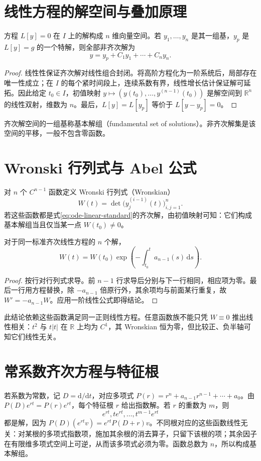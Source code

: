 \documentclass[UTF8,12pt,a4paper,fontset=fandol]{ctexbook}
\begin{document}
\section{线性方程的解空间与叠加原理}
\begin{theorem}
方程 $L[y]=0$ 在 $I$ 上的解构成 $n$ 维向量空间。若 $y_1,\ldots,y_n$ 是其一组基，$y_p$ 是 $L[y]=g$ 的一个特解，则全部非齐次解为
\[
 y=y_p+C_1y_1+\cdots+C_ny_n.
\]
\end{theorem}
\begin{proof}
线性性保证齐次解对线性组合封闭。将高阶方程化为一阶系统后，局部存在唯一性成立；在 $I$ 的每个紧时间段上，连续系数有界，线性增长估计保证解可延拓。因此给定 $t_0\in I$，初值映射 $y\mapsto(y(t_0),\ldots,y^{(n-1)}(t_0))$ 是解空间到 $\mathbb R^n$ 的线性双射，维数为 $n$。最后，$L[y]=L[y_p]$ 等价于 $L[y-y_p]=0$。
\end{proof}

齐次解空间的一组基称基本解组（fundamental set of solutions）。非齐次解集是该空间的平移，一般不包含零函数。

\section{Wronski 行列式与 Abel 公式}
对 $n$ 个 $C^{n-1}$ 函数定义 Wronski 行列式（Wronskian）
\[
 W(t)=\det\bigl(y_j^{(i-1)}(t)\bigr)_{i,j=1}^n.
\]
若这些函数都是式\eqref{eq:ode-linear-standard}的齐次解，由初值映射可知：它们构成基本解组当且仅当某一点 $W(t_0)\ne0$。

\begin{proposition}[Abel 公式]
对于同一标准齐次线性方程的 $n$ 个解，
\begin{equation}
 W(t)=W(t_0)\exp\!\left(-\int_{t_0}^t a_{n-1}(s)\,\mathrm ds\right).
 \label{eq:ode-abel}
\end{equation}
\end{proposition}
\begin{proof}
按行对行列式求导。前 $n-1$ 行求导后分别与下一行相同，相应项为零。最后一行用方程替换，除 $-a_{n-1}$ 倍原行外，其余项均与前面某行重复，故 $W'=-a_{n-1}W$。应用一阶线性公式即得结论。
\end{proof}

此结论依赖这些函数满足同一正则线性方程。任意函数族不能只凭 $W\equiv0$ 推出线性相关：$t^2$ 与 $t|t|$ 在 $\mathbb R$ 上均为 $C^1$，其 Wronskian 恒为零，但比较正、负半轴可知它们线性无关。

\section{常系数齐次方程与特征根}
若系数为常数，记 $D=\mathrm d/\mathrm dt$，对应多项式 $P(r)=r^n+a_{n-1}r^{n-1}+\cdots+a_0$。由 $P(D)e^{rt}=P(r)e^{rt}$，每个特征根 $r$ 给出指数解。若 $r$ 的重数为 $m$，则
\[
 e^{rt},te^{rt},\ldots,t^{m-1}e^{rt}
\]
都是解，因为 $P(D)(e^{rt}v)=e^{rt}P(D+r)v$。不同根对应的这些函数线性无关：对某根的多项式指数项，施加其余根的消去算子，只留下该根的项；其余因子在有限维多项式空间上可逆，从而该多项式必须为零。函数总数为 $n$，所以构成基本解组。
\end{document}
